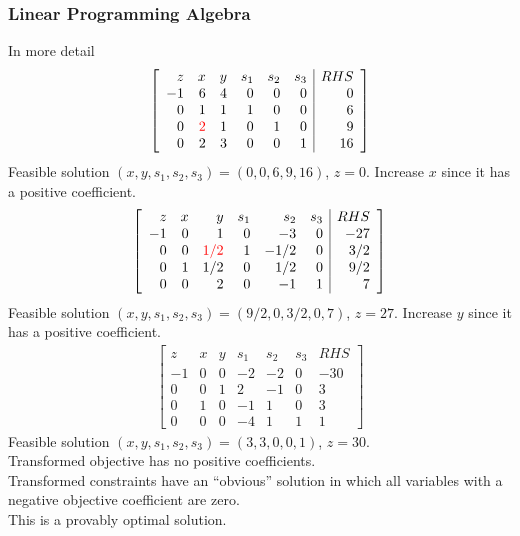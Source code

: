 \documentclass[12pt,handout]{beamer}
\begin{document}
\begin{frame}
\frametitle{Linear Programming Algebra}
\tiny
In more detail
\begin{eqnarray}
\left[ \begin{array}{rrrrrr|r}
z & x & y & s_1 & s_2 & s_3 & RHS \\
-1 & 6 & 4 & 0 & 0 & 0 & 0 \\
0 & 1 & 1 & 1 & 0 & 0 & 6 \\
0 & \color{red}2 & 1 & 0 & 1 & 0 & 9 \\
0 & 2 & 3 & 0 & 0 & 1 & 16
\end{array} \right] \nonumber
\end{eqnarray}
Feasible solution $(x, y, s_1, s_2, s_3) = (0, 0, 6, 9, 16)$, $z = 0$. Increase $x$ since it has a positive coefficient.
\begin{eqnarray}
\left[ \begin{array}{rrrrrr|r}
z & x & y & s_1 & s_2 & s_3 & RHS \\
-1 & 0 & 1 & 0 & -3 & 0 & -27 \\
0 & 0 & \color{red}1/2 & 1 & -1/2 & 0 & 3/2 \\
0 & 1 & 1/2 & 0 & 1/2 & 0 & 9/2 \\
0 & 0 & 2 & 0 & -1 & 1 & 7
\end{array} \right] \nonumber
\end{eqnarray}
Feasible solution $(x, y, s_1, s_2, s_3) = (9/2, 0, 3/2, 0, 7)$, $z = 27$. Increase $y$ since it has a positive coefficient.
\begin{eqnarray}
\left[ \begin{array}{rrrrrr|r}
z & x & y & s_1 & s_2 & s_3 & RHS \\
-1 & 0 & 0 & -2 & -2 & 0 & -30 \\
0 & 0 & 1 & 2 & -1 & 0 & 3 \\
0 & 1 & 0 & -1 & 1 & 0 & 3 \\
0 & 0 & 0 & -4 & 1 & 1 & 1
\end{array} \right] \nonumber
\end{eqnarray}
Feasible solution $(x, y, s_1, s_2, s_3) = (3, 3, 0, 0, 1)$, $z = 30$. \\
Transformed objective has no positive coefficients. \\
Transformed constraints have an ``obvious'' solution in which all variables with a negative objective coefficient are zero. \\
This is a provably optimal solution.
\end{frame}
\end{document}

